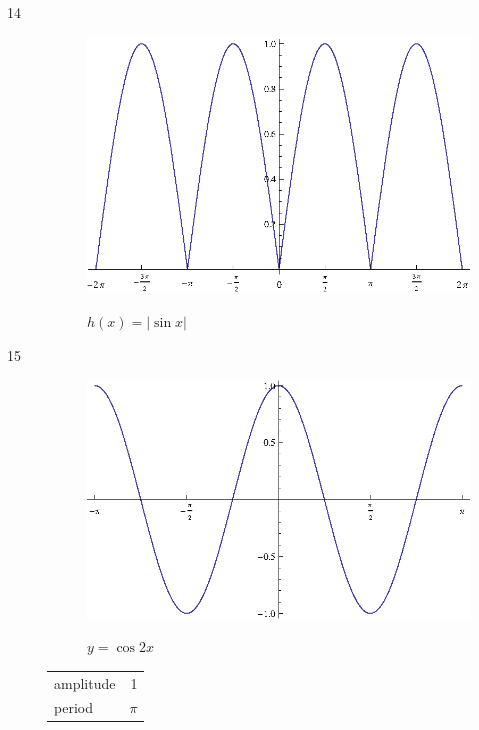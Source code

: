 \documentclass{exam}
\begin{document}
\begin{description}
      \item[14]
        \begin{figure}[H]
          \centering
          \includegraphics[scale=0.9]{exercise14.eps}

          $h(x) = | \sin x |$
        \end{figure}

      \item[15]
        \begin{figure}[H]
          \centering
          \includegraphics[scale=0.8]{exercise15.eps}

          $y = \cos 2x$
        \end{figure}

        \begin{tabular}[H]{lr}
          \toprule
          amplitude & 1 \\
          period    & $\pi$ \\
          \bottomrule
        \end{tabular}


\end{description}
\end{document}
